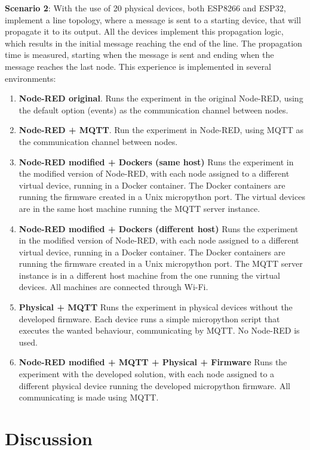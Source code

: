 \textbf{Scenario 2}:
With the use of 20 physical devices, both ESP8266 and ESP32, implement a line topology, where a message is sent to a starting device, that will propagate it to its output. All the devices implement this propagation logic, which results in the initial message reaching the end of the line. The propagation time is measured, starting when the message is sent and ending when the message reaches the last node.
This experience is implemented in several environments:
\begin{enumerate}
    \item \textbf{Node-RED original}. Runs the experiment in the original Node-RED, using the default option (events) as the communication channel between nodes.
    \item \textbf{Node-RED + MQTT}. Run the experiment in Node-RED, using MQTT as the communication channel between nodes.
    \item \textbf{Node-RED modified + Dockers (same host)} Runs the experiment in the modified version of Node-RED, with each node assigned to a different virtual device, running in a Docker container. The Docker containers are running the firmware created in a Unix micropython port. The virtual devices are in the same host machine running the MQTT server instance.
    \item \textbf{Node-RED modified + Dockers (different host)} Runs the experiment in the modified version of Node-RED, with each node assigned to a different virtual device, running in a Docker container. The Docker containers are running the firmware created in a Unix micropython port. The MQTT server instance is in a different host machine from the one running the virtual devices. All machines are connected through Wi-Fi.
    \item \textbf{Physical + MQTT} Runs the experiment in physical devices without the developed firmware. Each device runs a simple micropython script that executes the wanted behaviour, communicating by MQTT. No Node-RED is used.
    \item \textbf{Node-RED modified + MQTT + Physical + Firmware} Runs the experiment with the developed solution, with each node assigned to a different physical device running the developed micropython firmware. All communicating is made using MQTT.
\end{enumerate}

\section{Discussion}\label{sec:evaluation_discussion}


